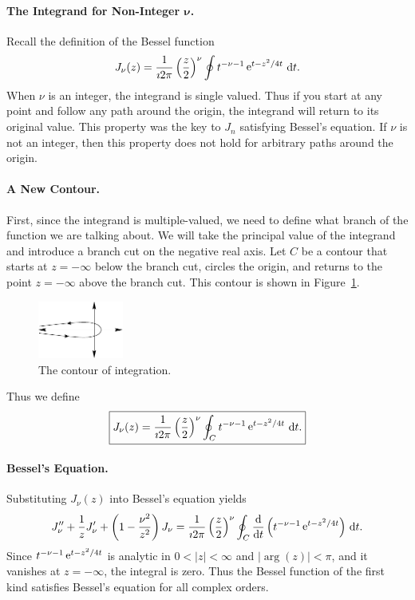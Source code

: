 \paragraph{The Integrand for Non-Integer $\mathbf{\boldsymbol{\nu}}$.}
Recall the definition of the Bessel function
\[ 
J_\nu(z) = \frac{1}{\imath 2 \pi} \left( \frac{z}{2} \right)^\nu \oint t^{-\nu-1}
\mathop{\mathrm{e}}\nolimits^{t - z^2/4t}\,\mathrm{d} t.
\]
When $\nu$ is an integer, the integrand is single valued.  Thus if you start
at any point and follow any path around the origin, the integrand will
return to its original value.  This property was the key to $J_n$ satisfying
Bessel's equation.  If $\nu$ is not an integer, then this property does not
hold for arbitrary paths around the origin.


\paragraph{A New Contour.}
First, since the integrand is multiple-valued, we need to define what 
branch of the function we are talking about.  We will take the principal
value of the integrand and introduce a branch cut on the negative real
axis.  Let $C$ be a contour that starts at $z = -\infty$ below the branch
cut, circles the origin, and returns to the point $z = -\infty$ above the 
branch cut.  This contour is shown in Figure~\ref{fig_cont_int}.

\begin{figure}[h!]
  \begin{center}
    \includegraphics[width=0.25\textwidth]{ode/gamma/fig_hank_cont}
  \end{center}

  \caption{The contour of integration.}
  \label{fig_cont_int}
\end{figure}



Thus we define
\[ 
\boxed{
  J_\nu(z) = \frac{1}{\imath 2 \pi} \left( \frac{z}{2} \right)^\nu \oint_C 
  t^{-\nu-1} \mathop{\mathrm{e}}\nolimits^{t - z^2/4t}\,\mathrm{d} t.
  } 
\]

\paragraph{Bessel's Equation.}
Substituting $J_\nu(z)$ into Bessel's equation yields
\[ 
J_\nu'' + \frac{1}{z} J_\nu' + \left(1 - \frac{\nu^2}{z^2} \right) J_\nu = 
\frac{1}{\imath 2 \pi} \left(\frac{z}{2}\right)^\nu \oint_C \frac{\mathrm{d}}{\mathrm{d} t}
\left(t^{-\nu-1}\mathop{\mathrm{e}}\nolimits^{t-z^2/4t} \right) \,\mathrm{d} t.
\]
Since $t^{-\nu-1}\mathop{\mathrm{e}}\nolimits^{t-z^2/4t}$ is analytic in $0 < |z| < \infty$ and 
$|\arg(z)| < \pi$, and it vanishes at $z = - \infty$, the integral is zero.  
Thus the Bessel function of the first kind satisfies Bessel's 
equation for all complex orders.




